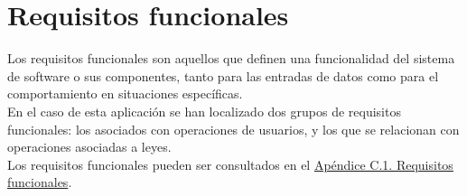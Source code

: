\section{Requisitos funcionales}

Los requisitos funcionales \cite{requisitos} son aquellos que definen una funcionalidad del sistema de software o sus componentes, tanto para las entradas de datos como para el comportamiento en situaciones específicas.
\\

En el caso de esta aplicación se han localizado dos grupos de requisitos funcionales: los asociados con operaciones de usuarios, y los que se relacionan con operaciones asociadas a leyes.
\\

Los requisitos funcionales pueden ser consultados en el \hyperref[APRequisitosFuncionales]{Apéndice C.1. Requisitos funcionales}.